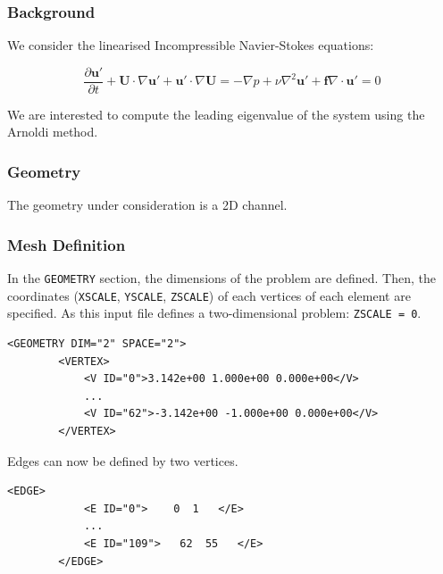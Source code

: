  \subsubsection{Background}
 
  We consider the linearised Incompressible Navier-Stokes equations: 
  
  \begin{subequations}
  \begin{equation}
    \frac{\partial \mathbf{u'}}{\partial t} + \mathbf{U} \cdot  \nabla \mathbf{u'}+\mathbf{u'} \cdot \nabla \mathbf{U} = -\nabla p + \nu \nabla^2 \mathbf{u'} + \mathbf{f}
  \end{equation}
  
  \begin{equation}
  \nabla \cdot \mathbf{u'} = 0
  \end{equation}
  \end{subequations}
  
  We are interested to compute the leading eigenvalue of the system using the Arnoldi method.
  
  \subsubsection{Geometry}
  
   The geometry under consideration is a 2D channel. 
   
   \subsubsection{Mesh Definition}
   
   In the \texttt{GEOMETRY} section, the dimensions of the problem are defined. Then, the coordinates (\texttt{XSCALE}, \texttt{YSCALE}, \texttt{ZSCALE}) of each vertices of each element are specified. As this input file defines a two-dimensional problem: \texttt{ZSCALE = 0}. 
   
  \begin{lstlisting}[style=XMLStyle]
<GEOMETRY DIM="2" SPACE="2">
        <VERTEX>
            <V ID="0">3.142e+00 1.000e+00 0.000e+00</V>
            ...
            <V ID="62">-3.142e+00 -1.000e+00 0.000e+00</V>
        </VERTEX>
\end{lstlisting}

Edges can now be defined by two vertices.

  \begin{lstlisting}[style=XMLStyle]
<EDGE>
            <E ID="0">    0  1   </E>
            ...
            <E ID="109">   62  55   </E>
        </EDGE>
\end{lstlisting}


